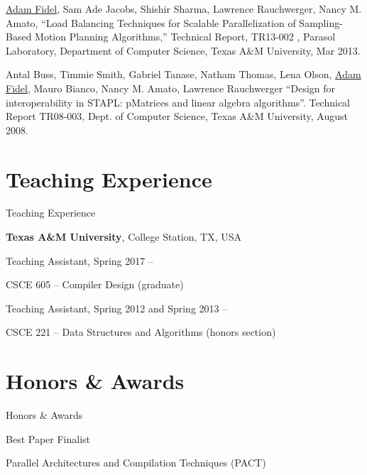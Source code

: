 \documentclass[a4paper,10pt,oneside]{article}
\begin{document}
\begin{body}
\EntryGap


{\underline{Adam Fidel}, Sam Ade Jacobs, Shishir Sharma, Lawrence Rauchwerger, Nancy M. Amato, ``Load Balancing Techniques for Scalable Parallelization of Sampling-Based Motion Planning Algorithms,'' Technical Report, TR13-002 , Parasol Laboratory, Department of Computer Science, Texas A\&M University, Mar 2013.}

\EntryGap


{Antal Buss, Timmie Smith, Gabriel Tanase, Natham Thomas, Lena Olson, \underline{Adam Fidel}, Mauro Bianco, Nancy M. Amato, Lawrence Rauchwerger ``Design for interoperability in STAPL: pMatrices and linear algebra algorithms''. Technical Report TR08-003, Dept. of Computer Science, Texas A\&M University, August 2008.}


\section{Teaching Experience}
{Teaching Experience}

{\textbf{Texas A\&M University}},
College Station, TX, USA
\par

Teaching Assistant, Spring 2017
\hfill
{} --
\begin{detail}
CSCE 605 -- Compiler Design (graduate)
\end{detail}

\EntryGap

Teaching Assistant, Spring 2012 and Spring 2013
\hfill
{} --
\begin{detail}
CSCE 221 -- Data Structures and Algorithms (honors section)
\end{detail}




\section{Honors \& Awards}
{Honors\newline
\& Awards}

Best Paper Finalist
\hfill
{}
\par
Parallel Architectures and Compilation Techniques (PACT)


\end{body}
\end{document}
